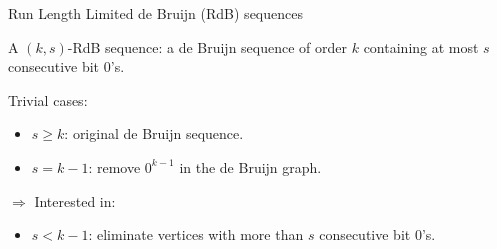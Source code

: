 \begin{frame}{Run Length Limited de Bruijn (RdB) sequences}
    \begin{definition}
        A $(k,s)$-RdB sequence: a de Bruijn sequence of order $k$ containing at most $s$ consecutive bit $0$'s.
    \end{definition}
    \begin{overprint}
            Trivial cases:
            \begin{itemize}
                \item $s\geq k$: original de Bruijn sequence.
                \item $s=k-1$: remove $0^{k-1}$ in the de Bruijn graph.
            \end{itemize}
            $\Rightarrow$ Interested in:
            \begin{itemize}
                \item $s<k-1$: eliminate vertices with more than $s$ consecutive bit $0$'s.
            \end{itemize}
            \begin{columns}
\end{columns}
\end{overprint}
\end{frame}
